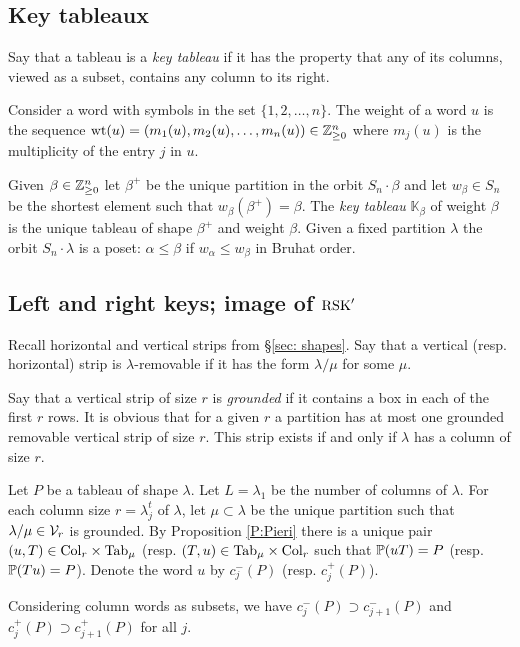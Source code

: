 \documentclass{ert-l} %
\begin{document}
\subsection{Key tableaux}\label{appsec:key tableaux}
Say that a tableau is a \textit{key tableau} if it has the property that
any of its columns, viewed as a subset, contains any column to its right.

Consider a word with symbols in the set $\{1,2,\dotsc,n\}$.
The weight of a word $u$ is the sequence $\mathrm{wt}(u)=(m_1(u),m_2(u),\dotsc,m_n(u))\in \mathbb{Z}_{\ge0}^n$ where $m_j(u)$ is the multiplicity of the entry $j$ in $u$.

Given $\beta\in \mathbb{Z}_{\ge0}^n$ let $\beta^+$ be the unique partition in the orbit
$S_n \cdot\beta$ and let $w_\beta\in S_n$ be the shortest element such that
$w_\beta(\beta^+)=\beta$. The \textit{key tableau} $\mathbb{K}_\beta$ of weight $\beta$ is the unique tableau of shape $\beta^+$ and weight $\beta$.
Given a fixed partition $\lambda$ the orbit $S_n\cdot\lambda$ is a poset:
$\alpha\le \beta$ if $w_\alpha \le w_\beta$ in Bruhat order.

\subsection{Left and right keys; image of $\operatorname{RSK}'$} \label{appsec: keys}
Recall horizontal and vertical strips from \S \ref{sec: shapes}.
Say that a vertical (resp. horizontal) strip is $\lambda$-removable if it has the form $\lambda/\mu$ for some $\mu$.

Say that a vertical strip of size $r$ is \textit{grounded} if it contains a box in each of the
first $r$ rows. It is obvious that for a given $r$ a partition has at most one grounded removable vertical strip of size $r$. This strip exists if and only if
$\lambda$ has a column of size $r$.

Let $P$ be a tableau of shape $\lambda$. Let $L=\lambda_1$ be the number of columns of $\lambda$. For each column size $r = \lambda^t_j$ of $\lambda$, let $\mu\subset\lambda$ be the unique partition such that
$\lambda/\mu\in \mathcal{V}_r$ is grounded. By Proposition \ref{P:Pieri}
there is a unique pair $(u,T)\in \mathrm{Col}_r \times \mathrm{Tab}_\mu$ (resp. $(T,u)\in \mathrm{Tab}_\mu\times \mathrm{Col}_r$ such that $\mathbb{P}(uT)=P$ (resp. $\mathbb{P}(Tu)=P$). Denote the word $u$ by $c_j^-(P)$ (resp. $c_j^+(P)$).


\begin{lemma} \label{L:key columns containment}
Considering column words as subsets, we have
$c_j^-(P) \supset c_{j+1}^-(P)$ and $c_j^+(P) \supset c_{j+1}^+(P)$
for all $j$.
\end{lemma}
\end{document}
